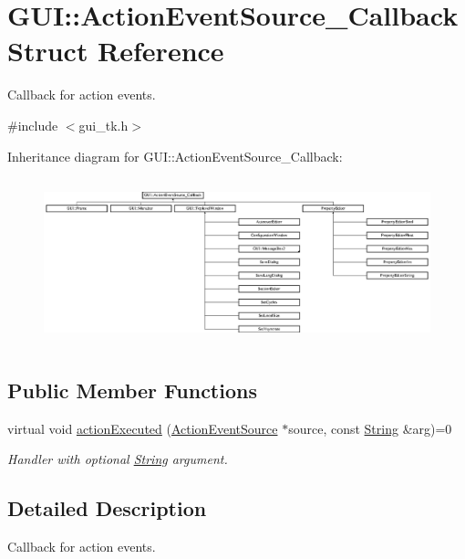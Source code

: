 \hypertarget{structGUI_1_1ActionEventSource__Callback}{\section{G\-U\-I\-:\-:Action\-Event\-Source\-\_\-\-Callback Struct Reference}
\label{structGUI_1_1ActionEventSource__Callback}
}


Callback for action events.  




{\ttfamily \#include $<$gui\-\_\-tk.\-h$>$}

Inheritance diagram for G\-U\-I\-:\-:Action\-Event\-Source\-\_\-\-Callback\-:\begin{figure}[H]
\begin{center}
\leavevmode
\includegraphics[height=4.865719cm]{structGUI_1_1ActionEventSource__Callback}
\end{center}
\end{figure}
\subsection*{Public Member Functions}
\begin{DoxyCompactItemize}
\item 
virtual void \hyperlink{structGUI_1_1ActionEventSource__Callback_a36df23a424558a83b45e3e3d5c175cf2}{action\-Executed} (\hyperlink{classGUI_1_1ActionEventSource}{Action\-Event\-Source} $\ast$source, const \hyperlink{classGUI_1_1String}{String} \&arg)=0
\begin{DoxyCompactList}\small\item\em Handler with optional \hyperlink{classGUI_1_1String}{String} argument. \end{DoxyCompactList}\end{DoxyCompactItemize}


\subsection{Detailed Description}
Callback for action events. 

